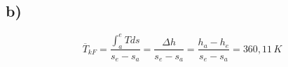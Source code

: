 

\subsection*{b)}

\[
\overline{T}_{kF} = \frac{\int_{a}^{e} T ds}{s_e - s_a} = \frac{\Delta h}{s_e - s_a} = \frac{h_a - h_e}{s_e - s_a} = 360,11 \, K
\]